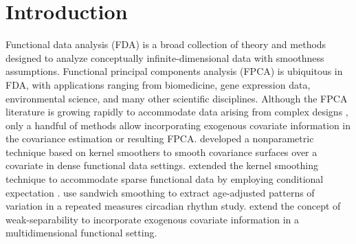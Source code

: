 \documentclass[useAMS,referee,usenatbib]{biom}
\begin{document}

\maketitle


\section{Introduction}
\label{s:intro}
\iffalse
The study investigated investigated peak alpha frequency (PAF), the frequency at which oscillations in the alpha rhythm [6-14 Hz] achieve maximal power and is known to shift from lower to higher frequencies as TD children age. The study found that children with ASD did not show increasing PAF with age. Furthermore, PAF was strongly correlated with non-verbal cognition. In this article we take a broader view and investigate the entire alpha spectrum as opposed to collapsing this information to a single point. EEG signals were recorded using a 128-channel sensor net at 500 Hz. After post-processing the raw EEG data, each child has 25 regions of interest and alpha spectral power captured from 6 to 14 Hz with .25 Hz increments. We propose to treat this data within a functional data framework, whree each spectral power curve is considered one observation. See \cite{Wang2016} for a broad review on functional data analysis (FDA). 
\fi
Functional data analysis (FDA) is a broad collection of theory and methods designed to analyze conceptually infinite-dimensional data with smoothness assumptions. Functional principal components analysis (FPCA) \citep{Wang2016} is ubiquitous in FDA, with applications ranging from biomedicine, gene expression data, environmental science, and many other scientific disciplines. Although the FPCA literature is growing rapidly to accommodate data arising from complex designs \citep{Baladandayuthapani2008, Staicu2010, Greven2010, Zipunnikov2011, Park2015, Scheffler2020}, only a handful of methods allow incorporating exogenous covariate information in the covariance estimation or resulting FPCA.  \cite{Cardot2007} developed a nonparametric technique based on kernel smoothers to smooth covariance surfaces over a covariate in dense functional data settings. \cite{Jiang2010} extended the kernel smoothing technique to accommodate sparse functional data by employing conditional expectation \citet{Yao2005}. \cite{Xiao2015} use sandwich smoothing \citep{Xiao2013} to extract age-adjusted patterns of variation in a repeated measures circadian rhythm study. \cite{Scheffler2020} extend the concept of weak-separability to incorporate exogenous covariate information in a multidimensional functional setting.
\end{document}
